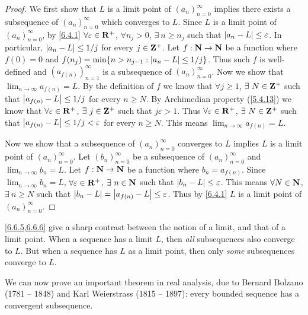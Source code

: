\begin{proof}
  We first show that \(L\) is a limit point of \((a_n)_{n = 0}^\infty\) implies there exists a subsequence of \((a_n)_{n = 0}^\infty\) which converges to \(L\).
  Since \(L\) is a limit point of \((a_n)_{n = 0}^\infty\), by \cref{6.4.1} \(\forall \varepsilon \in \mathbf{R}^+\), \(\forall n_j > 0\), \(\exists\ n \geq n_j\) such that \(\left\lvert a_n - L\right\rvert \leq \varepsilon\).
  In particular, \(\left\lvert a_n - L\right\rvert \leq 1 / j\) for every \(j \in \mathbf{Z}^+\).
  Let \(f : \mathbf{N} \to \mathbf{N}\) be a function where \(f(0) = 0\) and \(f(n_j) = \min\{n > n_{j - 1} : \left\lvert a_n - L\right\rvert \leq 1 / j\}\).
  Thus such \(f\) is well-defined and \((a_{f(n)})_{n = 1}^\infty\) is a subsequence of \((a_n)_{n = 0}^\infty\).
  Now we show that \(\lim_{n \to \infty} a_{f(n)} = L\).
  By the definition of \(f\) we know that \(\forall j \geq 1\), \(\exists\ N \in \mathbf{Z}^+\) such that \(\left\lvert a_{f(n)} - L\right\rvert \leq 1 / j\) for every \(n \geq N\).
  By Archimedian property (\cref{5.4.13}) we know that \(\forall \varepsilon \in \mathbf{R}^+\), \(\exists\ j \in \mathbf{Z}^+\) such that \(j \varepsilon > 1\).
  Thus \(\forall \varepsilon \in \mathbf{R}^+\), \(\exists\ N \in \mathbf{Z}^+\) such that \(\left\lvert a_{f(n)} - L\right\rvert \leq 1 / j < \varepsilon\) for every \(n \geq N\).
  This means \(\lim_{n \to \infty} a_{f(n)} = L\).

  Now we show that a subsequence of \((a_n)_{n = 0}^\infty\) converges to \(L\) implies \(L\) is a limit point of \((a_n)_{n = 0}^\infty\).
  Let \((b_n)_{n = 0}^\infty\) be a subsequence of \((a_n)_{n = 0}^\infty\) and \(\lim_{n \to \infty} b_n = L\).
  Let \(f : \mathbf{N} \to \mathbf{N}\) be a function where \(b_n = a_{f(n)}\).
  Since \(\lim_{n \to \infty} b_n = L\), \(\forall \varepsilon \in \mathbf{R}^+\), \(\exists\ n \in \mathbf{N}\) such that \(\left\lvert b_n - L\right\rvert \leq \varepsilon\).
  This means \(\forall N \in \mathbf{N}\), \(\exists\ n \geq N\) such that \(\left\lvert b_n - L\right\rvert = \left\lvert a_{f(n)} - L\right\rvert \leq \varepsilon\).
  Thus by \cref{6.4.1} \(L\) is a limit point of \((a_n)_{n = 0}^\infty\).
\end{proof}

\begin{remark}\label{6.6.7}
  \cref{6.6.5,6.6.6} give a sharp contrast between the notion of a limit, and that of a limit point.
  When a sequence has a limit \(L\), then \emph{all} subsequences also converge to \(L\).
  But when a sequence has \(L\) as a limit point, then only \emph{some} subsequences converge to \(L\).
\end{remark}

\begin{note}
  We can now prove an important theorem in real analysis, due to Bernard Bolzano (1781 -- 1848) and Karl Weierstrass (1815 -- 1897):
  every bounded sequence has a convergent subsequence.
\end{note}

